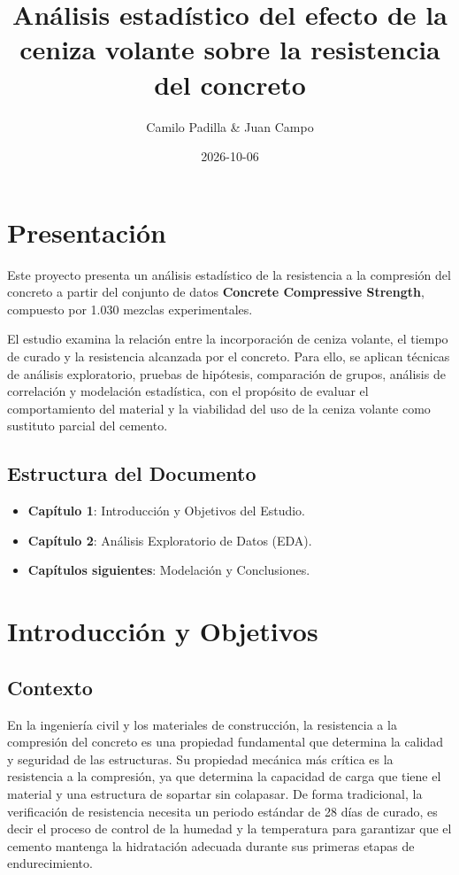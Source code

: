 \documentclass[
]{book}
\title{Análisis estadístico del efecto de la ceniza volante sobre la resistencia del concreto}
\author{Camilo Padilla \& Juan Campo}
\date{2026-10-06}
\providecommand{\tightlist}{%
  \setlength{\itemsep}{0pt}\setlength{\parskip}{0pt}}
\begin{document}
\maketitle

{
\setcounter{tocdepth}{1}
\tableofcontents
}
\chapter{Presentación}\label{presentaciuxf3n}

Este proyecto presenta un análisis estadístico de la resistencia a la compresión del concreto a partir del conjunto de datos \textbf{Concrete Compressive Strength}, compuesto por 1.030 mezclas experimentales.

El estudio examina la relación entre la incorporación de ceniza volante, el tiempo de curado y la resistencia alcanzada por el concreto. Para ello, se aplican técnicas de análisis exploratorio, pruebas de hipótesis, comparación de grupos, análisis de correlación y modelación estadística, con el propósito de evaluar el comportamiento del material y la viabilidad del uso de la ceniza volante como sustituto parcial del cemento.

\section{Estructura del Documento}\label{estructura-del-documento}

\begin{itemize}
\tightlist
\item
  \textbf{Capítulo 1}: Introducción y Objetivos del Estudio.
\item
  \textbf{Capítulo 2}: Análisis Exploratorio de Datos (EDA).
\item
  \textbf{Capítulos siguientes}: Modelación y Conclusiones.
\end{itemize}

\chapter{Introducción y Objetivos}\label{intro}

\section{Contexto}\label{contexto}

En la ingeniería civil y los materiales de construcción, la resistencia a la compresión del concreto es una propiedad fundamental que determina la calidad y seguridad de las estructuras. Su propiedad mecánica más crítica es la resistencia a la compresión, ya que determina la capacidad de carga que tiene el material y una estructura de sopartar sin colapasar. De forma tradicional, la verificación de resistencia necesita un periodo estándar de 28 días de curado, es decir el proceso de control de la humedad y la temperatura para garantizar que el cemento mantenga la hidratación adecuada durante sus primeras etapas de endurecimiento.
\end{document}

